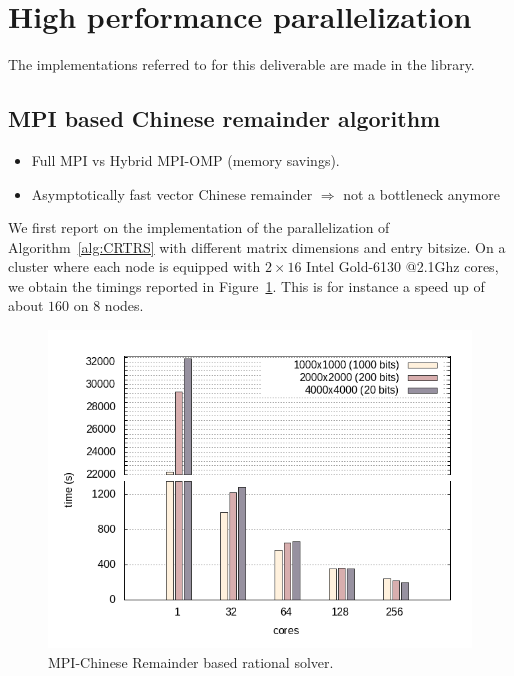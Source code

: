 \section{High performance parallelization}

The implementations referred to for this deliverable are made in the \Linbox library.


\subsection{MPI based Chinese remainder algorithm}

\begin{itemize}
\item  Full MPI vs Hybrid MPI-OMP (memory savings).
\item Asymptotically fast vector Chinese remainder $\Rightarrow$ not a bottleneck anymore
\end{itemize}


We first report on the implementation of the parallelization of
Algorithm~\ref{alg:CRTRS} with different matrix dimensions and entry
bitsize. 
On a cluster where each node is equipped
with $2{\times}16$ Intel Gold-6130 @2.1Ghz cores, we obtain the
timings reported in
Figure~\ref{fig:mpi_histo}.
This is for instance a speed up of about $160$ on $8$ nodes.

\begin{figure}[htb]
\begin{center}
  \includegraphics[width=.8\textwidth]{nodes_histogram}
\end{center}
\caption{MPI-Chinese Remainder based rational solver.}\label{fig:mpi_histo}
\end{figure}

